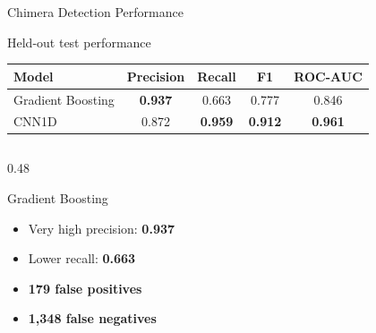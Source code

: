 \documentclass[aspectratio=169,11pt]{beamer}
\begin{document}
\begin{frame}{Chimera Detection Performance}

\vspace{-0.10cm}

\begin{center}
{\small\color{mitogray}Held-out test performance}
\end{center}

\vspace{-0.02cm}

\begin{center}
\footnotesize
\renewcommand{\arraystretch}{1.10}

\begin{tabular}{lcccc}
\toprule
\textbf{Model} &
\textbf{Precision} &
\textbf{Recall} &
\textbf{F1} &
\textbf{ROC-AUC} \\
\midrule

Gradient Boosting &
\textbf{0.937} &
0.663 &
0.777 &
0.846 \\

CNN1D &
0.872 &
\textbf{0.959} &
\textbf{0.912} &
\textbf{0.961} \\

\bottomrule
\end{tabular}
\end{center}

\vspace{0.10cm}

\begin{columns}[T,onlytextwidth]


\begin{column}{0.48\textwidth}

\begin{block}{Gradient Boosting}
\footnotesize

\begin{itemize}
    \setlength{\itemsep}{2pt}
    \setlength{\parskip}{0pt}

    \item Very high precision: \textbf{0.937}
    \item Lower recall: \textbf{0.663}
    \item \textbf{179 false positives}
    \item \textbf{1,348 false negatives}

\end{itemize}

\end{block}


\end{column}
\end{columns}
\end{frame}
\end{document}
